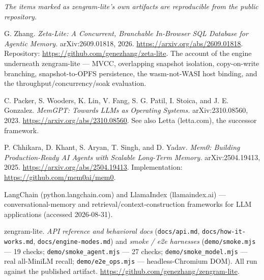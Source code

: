 \documentclass[11pt]{article}
\newcommand{\code}[1]{\texttt{#1}}
\begin{document}
{\small
\emph{The items marked as zengram-lite's own artifacts are reproducible from the
public repository.}

\begin{description}[leftmargin=3.2em,style=nextline,itemsep=0.3em]
  \item[{[ZL]}] G. Zhang. \emph{Zeta-Lite: A Concurrent, Branchable In-Browser SQL
    Database for Agentic Memory.} arXiv:2609.01818, 2026.
    \url{https://arxiv.org/abs/2609.01818}. Repository:
    \url{https://github.com/genezhang/zeta-lite}. The account
    of the engine underneath zengram-lite --- MVCC, overlapping snapshot isolation,
    copy-on-write branching, snapshot-to-OPFS persistence, the wasm-not-WASI host
    binding, and the throughput/concurrency/soak evaluation.
  \item[{[1]}] C. Packer, S. Wooders, K. Lin, V. Fang, S. G. Patil, I. Stoica, and
    J. E. Gonzalez. \emph{MemGPT: Towards LLMs as Operating Systems.}
    arXiv:2310.08560, 2023. \url{https://arxiv.org/abs/2310.08560}. See also Letta
    (letta.com), the successor framework.
  \item[{[2]}] P. Chhikara, D. Khant, S. Aryan, T. Singh, and D. Yadav. \emph{Mem0:
    Building Production-Ready AI Agents with Scalable Long-Term Memory.}
    arXiv:2504.19413, 2025. \url{https://arxiv.org/abs/2504.19413}. Implementation:
    \url{https://github.com/mem0ai/mem0}.
  \item[{[3]}] LangChain (python.langchain.com) and LlamaIndex (llamaindex.ai) ---
    conversational-memory and retrieval/context-construction frameworks for LLM
    applications (accessed 2026-08-31).
  \item[{[4]}] zengram-lite. \emph{API reference and behavioral docs}
    (\code{docs/api.md}, \code{docs/how-it-works.md}, \code{docs/engine-modes.md})
    and \emph{smoke / e2e harnesses} (\code{demo/smoke.mjs} --- 19 checks;
    \code{demo/smoke\_agent.mjs} --- 27 checks; \code{demo/smoke\_model.mjs} ---
    real all-MiniLM recall; \code{demo/e2e\_ops.mjs} --- headless-Chromium DOM).
    All run against the published artifact.
    \url{https://github.com/genezhang/zengram-lite}.
\end{description}
}
\end{document}
